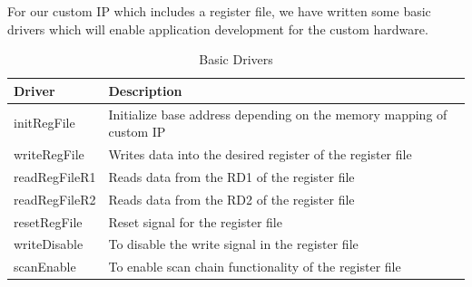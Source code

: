 For our custom IP which includes a register file, we have written some basic drivers which will enable application development for the custom hardware.
\newpage
\begin{table}[h]
		\centering
		\begin{tabularx}{\textwidth}{|p{3cm}   |X|}
			\hline
			\textbf{Driver}  & \textbf{Description}\\
			\hline
			initRegFile & Initialize base address depending on the memory mapping of custom IP     \\
            \hline
			writeRegFile & Writes data into the desired register of the register file  \\
			\hline
			readRegFileR1 & Reads data from the RD1 of the register file    \\
			\hline
			readRegFileR2 & Reads data from the RD2 of the register file    \\
			\hline
            resetRegFile & Reset signal for the register file   \\
			\hline
            writeDisable & To disable the write signal in the register file   \\
			\hline
           scanEnable & To enable scan chain functionality of the register file  \\
			\hline
		\end{tabularx}
		\caption{Basic Drivers}
	\end{table}
